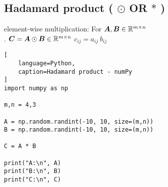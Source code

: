 \subsection{Hadamard product ( $\odot$ OR $\ast$ ) \cite{mfml/book/mml/Deisenroth-Faisal-Ong}}

element-wise multiplication: For $\bm{A}, \bm{B} \in \mathbb{R}^{m\times n}$
\\
.\hfill
$
    \bm{C} = \bm{A} \odot \bm{B} \in \mathbb{R}^{m\times n}
$
\hfill
$
    c_{ij} = a_{ij}\ b_{ij}
$
\hfill














\begin{lstlisting}[
    language=Python,
    caption=Hadamard product - numPy
]
import numpy as np

m,n = 4,3

A = np.random.randint(-10, 10, size=(m,n))
B = np.random.randint(-10, 10, size=(m,n))

C = A * B

print("A:\n", A)
print("B:\n", B)
print("C:\n", C)
\end{lstlisting}










